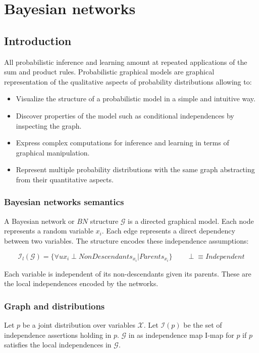 \chapter{Bayesian networks}

\section{Introduction}
All probabilistic inference and learning amount at repeated applications of the sum and product rules.
Probabilistic graphical models are graphical representation of the qualitative aspects of probability distributions allowing to:

\begin{multicols}{2}
	\begin{itemize}
		\item Visualize the structure of a probabilistic model in a simple and intuitive way.
		\item Discover properties of the model such as conditional independences by inspecting the graph.
		\item Express complex computations for inference and learning in terms of graphical manipulation.
		\item Represent multiple probability distributions with the same graph abstracting from their quantitative aspects.
	\end{itemize}
\end{multicols}

	\subsection{Bayesian networks semantics}
	A Bayesian network or $BN$ structure $\mathcal{G}$ is a directed graphical model.
	Each node represents a random variable $x_i$.
	Each edge represents a direct dependency between two variables.
	The structure encodes these independence assumptions:

	$$\mathcal{I}_l(\mathcal{G}) = \{\forall u x_i \perp NonDescendants_{x_i}|Parents_{x_i}\} \qquad\perp \equiv Independent$$

	Each variable is independent of its non-descendants given its parents.
	These are the local independences encoded by the networks.

	\subsection{Graph and distributions}
	Let $p$ be a joint distribution over variables $\mathcal{X}$.
	Let $\mathcal{I}(p)$ be the set of independence assertions holding in $p$.
	$\mathcal{G}$ in as independence map I-map for $p$ if $p$ satisfies the local independences in $\mathcal{G}$.

